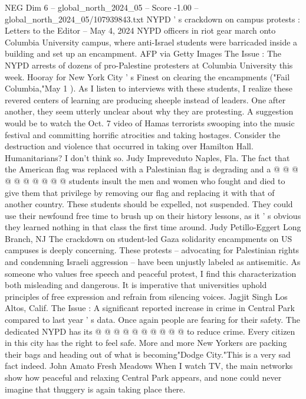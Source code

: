 \begin{textsample}{NEG Dim 6 – global\_north\_2024\_05 – Score -1.00 – global\_north\_2024\_05/107939843.txt}  \label{ex:f6_neg_291}
NYPD ' s crackdown on campus protests : Letters to the Editor -- May 4, 2024 NYPD officers in riot gear march onto Columbia University campus, where anti-Israel students were barricaded inside a building and set up an encampment.
AFP via Getty Images The Issue : The NYPD arrests of dozens of pro-Palestine protesters at Columbia University this week.
Hooray for New York City ' s Finest on clearing the encampments ("Fail Columbia,"May 1 ).
As I listen to interviews with these students, I realize these revered centers of learning are producing sheeple instead of leaders.
One after another, they seem utterly unclear about why they are protesting.
A suggestion would be to watch the Oct. 7 video of Hamas terrorists swooping into the music festival and committing horrific atrocities and taking hostages.
Consider the destruction and violence that occurred in taking over Hamilton Hall.
Humanitarians?
I don't think so.
Judy Impreveduto Naples, Fla.
The fact that the American flag was replaced with a Palestinian flag is degrading and a @ @ @ @ @ @ @ @ @ @ students insult the men and women who fought and died to give them that privilege by removing our flag and replacing it with that of another country.
These students should be expelled, not suspended.
They could use their newfound free time to brush up on their history lessons, as it ' s obvious they learned nothing in that class the first time around.
Judy Petillo-Eggert Long Branch, NJ The crackdown on student-led Gaza solidarity encampments on US campuses is deeply concerning.
These protests -- advocating for Palestinian rights and condemning Israeli aggression -- have been unjustly labeled as antisemitic.
As someone who values free speech and peaceful protest, I find this characterization both misleading and dangerous.
It is imperative that universities uphold principles of free expression and refrain from silencing voices.
Jagjit Singh Los Altos, Calif.
The Issue : A significant reported increase in crime in Central Park compared to last year ' s data.
Once again people are fearing for their safety.
The dedicated NYPD has its @ @ @ @ @ @ @ @ @ @ to reduce crime.
Every citizen in this city has the right to feel safe.
More and more New Yorkers are packing their bags and heading out of what is becoming"Dodge City."This is a very sad fact indeed.
John Amato Fresh Meadows When I watch TV, the main networks show how peaceful and relaxing Central Park appears, and none could never imagine that thuggery is again taking place there.

\end{textsample}
